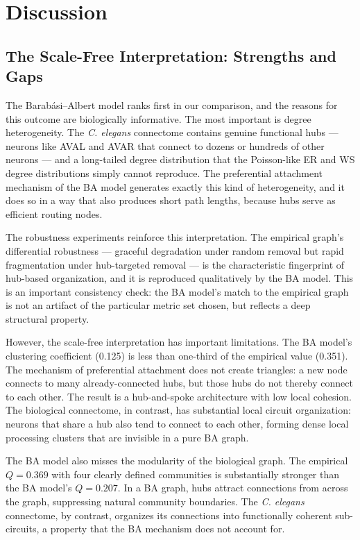 \documentclass[12pt,a4paper]{report}
\begin{document}
\chapter{Discussion}

\section{The Scale-Free Interpretation: Strengths and Gaps}

The Barab\'{a}si--Albert model ranks first in our comparison, and the reasons for this outcome are biologically informative. The most important is degree heterogeneity. The \textit{C. elegans} connectome contains genuine functional hubs — neurons like AVAL and AVAR that connect to dozens or hundreds of other neurons — and a long-tailed degree distribution that the Poisson-like ER and WS degree distributions simply cannot reproduce. The preferential attachment mechanism of the BA model generates exactly this kind of heterogeneity, and it does so in a way that also produces short path lengths, because hubs serve as efficient routing nodes.

The robustness experiments reinforce this interpretation. The empirical graph's differential robustness — graceful degradation under random removal but rapid fragmentation under hub-targeted removal — is the characteristic fingerprint of hub-based organization, and it is reproduced qualitatively by the BA model. This is an important consistency check: the BA model's match to the empirical graph is not an artifact of the particular metric set chosen, but reflects a deep structural property.

However, the scale-free interpretation has important limitations. The BA model's clustering coefficient (0.125) is less than one-third of the empirical value (0.351). The mechanism of preferential attachment does not create triangles: a new node connects to many already-connected hubs, but those hubs do not thereby connect to each other. The result is a hub-and-spoke architecture with low local cohesion. The biological connectome, in contrast, has substantial local circuit organization: neurons that share a hub also tend to connect to each other, forming dense local processing clusters that are invisible in a pure BA graph.

The BA model also misses the modularity of the biological graph. The empirical $Q = 0.369$ with four clearly defined communities is substantially stronger than the BA model's $Q = 0.207$. In a BA graph, hubs attract connections from across the graph, suppressing natural community boundaries. The \textit{C. elegans} connectome, by contrast, organizes its connections into functionally coherent sub-circuits, a property that the BA mechanism does not account for.
\end{document}
